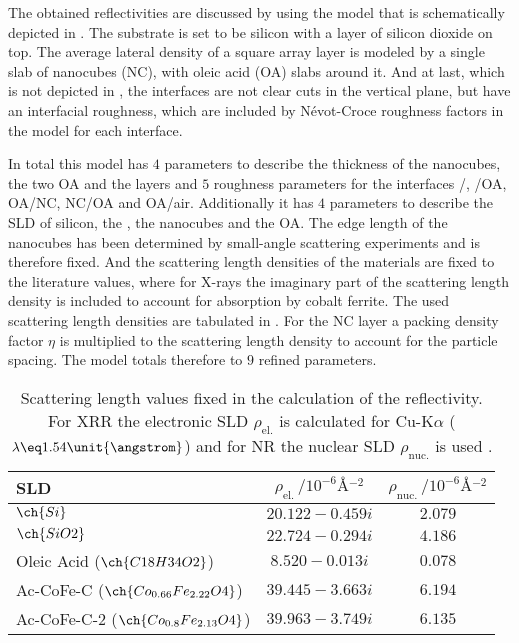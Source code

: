 \documentclass[\main/dresen_thesis.tex]{subfiles}
\begin{document}
    The obtained reflectivities are discussed by using the model that is schematically depicted in .
    The substrate is set to be silicon with a layer of silicon dioxide on top.
    The average lateral density of a square array layer is modeled by a single slab of nanocubes (NC), with oleic acid (OA) slabs around it.
    And at last, which is not depicted in , the interfaces are not clear cuts in the vertical plane, but have an interfacial roughness, which are included by Névot-Croce roughness factors in the model for each interface.

    In total this model has $4$ parameters to describe the thickness of the nanocubes, the two OA and the  layers and $5$ roughness parameters for the interfaces /, /OA, OA/NC, NC/OA  and OA/air.
    Additionally it has $4$ parameters to describe the SLD of silicon, the , the nanocubes and the OA.
    The edge length of the nanocubes has been determined by small-angle scattering experiments and is therefore fixed.
    And the scattering length densities of the materials are fixed to the literature values, where for X-rays the imaginary part of the scattering length density is included to account for absorption by cobalt ferrite.
    The used scattering length densities are tabulated in .
    For the NC layer a packing density factor $\eta$ is multiplied to the scattering length density to account for the particle spacing.
    The model totals therefore to $9$ refined parameters.

    \begin{table}[ht]
      \centering
      \caption{\label{tab:monolayers:charMethod:reflectometryScatteringLenghts}Scattering length values fixed in the calculation of the reflectivity. For XRR the electronic SLD $\rho_\mathrm{el.}$ is calculated for Cu-K$\alpha$ ($\lambda \eq 1.54 \unit{\angstrom}$) and for NR the nuclear SLD $\rho_\mathrm{nuc.}$ is used \cite{Sears_1992_Neutr, BerkeleyLab_1993_asf}.}
      \begin{tabular}{ l | c | c }
        \textbf{SLD}  & $\rho_\mathrm{el.} \, / \unit{10^{-6} \angstrom^{-2}}$ & $\rho_\mathrm{nuc.} \, / \unit{10^{-6} \angstrom^{-2}}$ \\
        \hline
        $\ch{Si}$                                 & $20.122 - 0.459 i$   & $2.079$  \\
        $\ch{SiO2}$                               & $22.724 - 0.294 i$   & $4.186$  \\
        Oleic Acid ($\ch{C18H34O2}$)              & $8.520  - 0.013 i$   & $0.078$  \\
        Ac-CoFe-C ($\ch{Co_{0.66}Fe_{2.22}O4}$)   & $39.445 - 3.663 i$   & $6.194$  \\
        Ac-CoFe-C-2 ($\ch{Co_{0.8} Fe_{2.13}O4}$) & $39.963 - 3.749 i$   & $6.135$  \\
        \hline
      \end{tabular}
    \end{table}
\end{document}
